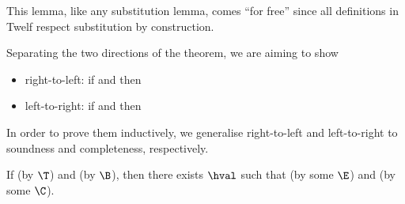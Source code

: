 \Twelf
This lemma, like any substitution lemma, comes ``for free'' since all definitions in Twelf respect substitution by construction.

\vspace{0.5cm}

\noindent Separating the two directions of the theorem, we are aiming to show
\begin{itemize}
	\item[]right-to-left: if \trahb{\hbctx}{\envnil}{\bexp}{\hexp} and \bev{\envnil}{\bexp}{\n{\nat}} then \hev{\hexp}{\n{\nat}}
	\item[]left-to-right: if \trahb{\hbctx}{\envnil}{\bexp}{\hexp} and \hev{\hexp}{\n{\nat}} then \bev{\envnil}{\bexp}{\n{\nat}}
\end{itemize}
In order to prove them inductively, we generalise right-to-left and left-to-right to soundness and completeness, respectively.

\begin{lemma}[Soundness]
\label{lem:soundness-hb}
If \trahb{\hbctx}{\benv}{\hexp}{\bexp} (by $\T$) and \bev{\benv}{\bexp}{\bval} (by $\B$), then there exists $\hval$ such that \hev{\hexp}{\hval} (by some $\E$) and \corhb{\hbctx}{\bval}{\hval} (by some $\C$).
\end{lemma}


